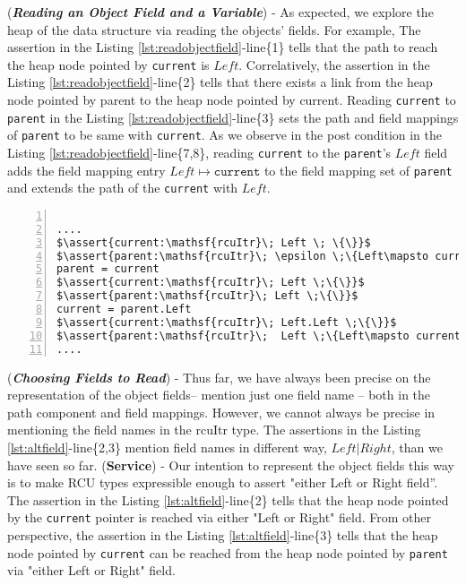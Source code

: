 (\textit{\textbf{Reading an Object Field and a Variable}}) - As expected, we explore the heap of the data structure via reading the objects' fields. For example, The assertion in the Listing \ref{lst:readobjectfield}-line\{1\} tells that the path to reach the heap node pointed by \texttt{current} is $Left$. Correlatively, the assertion in the Listing \ref{lst:readobjectfield}-line\{2\} tells that there exists a link from the heap node pointed by \textsf{parent} to the heap node pointed by \textsf{current}. Reading \texttt{current} to \texttt{parent} in the Listing \ref{lst:readobjectfield}-line\{3\} sets the path and field mappings of \texttt{parent} to be same with \texttt{current}. As we observe in the post condition in the Listing \ref{lst:readobjectfield}-line\{7,8\}, reading \texttt{current} to the \texttt{parent}'s $Left$ field adds the field mapping entry $Left \mapsto \texttt{current}$ to the field mapping set of \texttt{parent} and extends the path of the \texttt{current} with $Left$.
\begin{lstlisting}[caption={Reading a object field},label={lst:readobjectfield}, numbers=left, numberstyle=\tiny\color{red}, numbersep=5pt]%, basicstyle=\scriptsize]

....
$\assert{current:\mathsf{rcuItr}\; Left \; \{\}}$
$\assert{parent:\mathsf{rcuItr}\; \epsilon \;\{Left\mapsto current\}}$
parent = current
$\assert{current:\mathsf{rcuItr}\; Left \;\{\}}$
$\assert{parent:\mathsf{rcuItr}\; Left \;\{\}}$
current = parent.Left
$\assert{current:\mathsf{rcuItr}\; Left.Left \;\{\}}$
$\assert{parent:\mathsf{rcuItr}\;  Left \;\{Left\mapsto current\}}$
....
\end{lstlisting}

(\textit{\textbf{Choosing Fields to Read}}) - Thus far, we have always been precise on the representation of the object fields-- mention just one field name -- both in the path component and field mappings. However, we cannot always be precise in mentioning the field names in the \textsf{rcuItr} type. The assertions in the Listing \ref{lst:altfield}-line\{2,3\} mention field names in different way, $Left|Right$, than we have seen so far. (\textbf{Service}) - Our intention to represent the object fields this way is to make \textsf{RCU} types expressible enough to assert "either Left or Right field''. The assertion in the Listing \ref{lst:altfield}-line\{2\} tells that the heap node pointed by the \texttt{current} pointer is reached via either "Left or Right" field. From other perspective, the assertion in the Listing \ref{lst:altfield}-line\{3\} tells that the heap node pointed by \texttt{current} can be reached from the heap node pointed by \texttt{parent} via "either Left or Right" field. 

